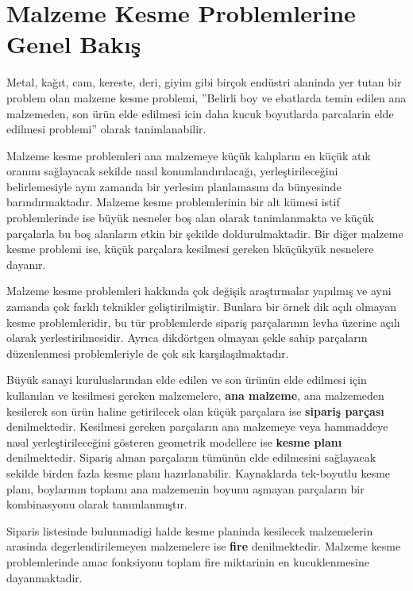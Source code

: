 \documentclass[]{book}
\begin{document}
\hypertarget{malzeme-kesme-problemlerine-genel-bakis}{%
\section{Malzeme Kesme Problemlerine Genel Bakış}\label{malzeme-kesme-problemlerine-genel-bakis}}

Metal, kağıt, cam, kereste, deri, giyim gibi birçok endüstri alaninda yer tutan bir problem olan malzeme kesme problemi, ''Belirli boy ve ebatlarda temin edilen ana malzemeden, son ürün elde edilmesi icin daha kucuk boyutlarda parcalarin elde edilmesi problemi'' olarak tanimlanabilir.

Malzeme kesme problemleri ana malzemeye küçük kalıpların en küçük atık oranını sağlayacak sekilde nasıl konumlandırılacağı, yerleştirileceğini belirlemesiyle aynı zamanda bir yerlesim planlamasını da bünyesinde barındırmaktadır. Malzeme kesme problemlerinin bir alt kümesi istif problemlerinde ise büyük nesneler boş alan olarak tanimlanmakta ve küçük parçalarla bu boş alanların etkin bir şekilde doldurulmaktadir. Bir diğer malzeme kesme problemi ise, küçük parçalara kesilmesi gereken bküçükyük nesnelere dayanır.

Malzeme kesme problemleri hakkında çok değişik araştırmalar yapılmış ve ayni zamanda çok farklı teknikler geliştirilmiştir. Bunlara bir örnek dik açılı olmayan kesme problemleridir, bu tür problemlerde sipariş parçalarının levha üzerine açılı olarak yerlestirilmesidir. Ayrıca dikdörtgen olmayan şekle sahip parçaların düzenlenmesi problemleriyle de çok sık karşılaşılmaktadır.

Büyük sanayi kuruluslarından elde edilen ve son ürünün elde edilmesi için kullanılan ve kesilmesi gereken malzemelere, \textbf{ana malzeme}, ana malzemeden kesilerek son ürün haline getirilecek olan küçük parçalara ise \textbf{sipariş parçası} denilmektedir. Kesilmesi gereken parçaların ana malzemeye veya hammaddeye nasıl yerleştirileceğini gösteren geometrik modellere ise \textbf{kesme planı} denilmektedir. Sipariş alınan parçaların tümünün elde edilmesini sağlayacak sekilde birden fazla kesme planı hazırlanabilir. Kaynaklarda tek-boyutlu kesme planı, boylarının toplamı ana malzemenin boyunu aşmayan parçaların bir kombinasyonu olarak tanımlanmıştır.

Siparis listesinde bulunmadigi halde kesme planinda kesilecek malzemelerin arasinda degerlendirilemeyen malzemelere ise \textbf{fire} denilmektedir. Malzeme kesme problemlerinde amac fonksiyonu toplam fire miktarinin en kucuklenmesine dayanmaktadir.
\end{document}
